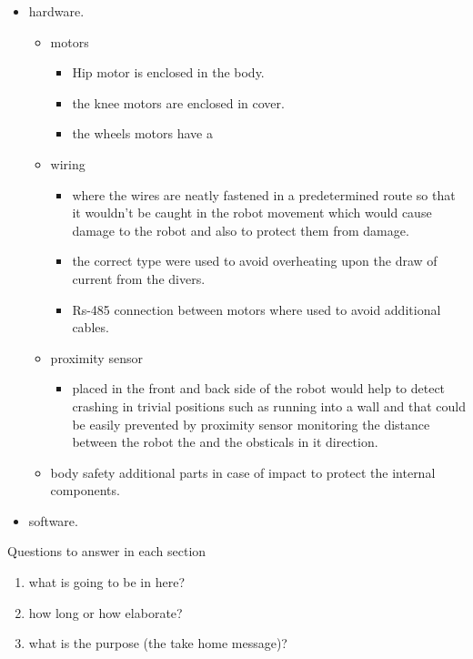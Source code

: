 \begin{itemize}
	\item hardware.
	\begin{itemize}
		\item motors
			\begin{itemize}
				\item Hip motor is enclosed in the body.
				\item the knee motors are enclosed in cover.
				\item the wheels motors have a
			\end{itemize}
		\item wiring
		\begin{itemize}
			\item where the wires are neatly fastened in a predetermined route so that it wouldn't be caught in the robot movement which would cause damage to the robot and also to protect them from damage.
			\item the correct type were used to avoid overheating upon the draw of current from the divers.
			\item Rs-485 connection between motors where used to avoid additional cables.
		\end{itemize}

		\item proximity sensor
		\begin{itemize}
			\item  placed in the front and back side of the robot would help to detect crashing in trivial positions such as running into a wall and that could be easily prevented by proximity sensor monitoring the distance between the robot the and the obsticals in it direction.
		\end{itemize}

		\item body safety additional parts in case of impact to protect the internal components.
	\end{itemize}
	\item software.

\end{itemize}


Questions to answer in each section


\begin{enumerate}
	\item what is going to be in here?
	\item how long or how elaborate?
	\item what is the purpose (the take home message)?
\end{enumerate}





